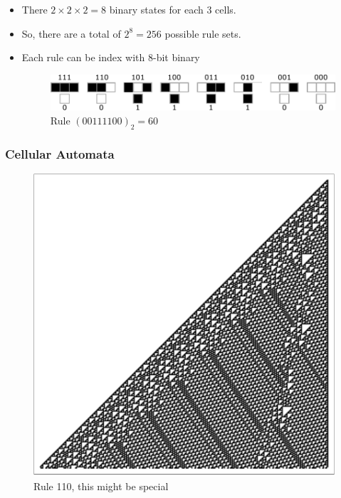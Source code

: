 \documentclass{beamer}
\begin{document}
\begin{frame}
    \begin{itemize}
        \item There $2\times2\times2=8$ binary states for each 3 cells.
        \item So, there are a total of $2^8 = 256$ possible rule sets.
        \item Each rule can be index with 8-bit binary
        \begin{figure}
            \centering
            \includegraphics[scale=0.7]{rule60Num.pdf}
            \caption{Rule $(00111100)_2 = 60$}
        \end{figure}
    \end{itemize}
\end{frame}

\begin{frame}
    \frametitle{Cellular Automata}
    \begin{figure}
        \centering
        \includegraphics[scale=0.53]{fig4.pdf}
        \caption{Rule 110, this might be special}
    \end{figure}
\end{frame}
\end{document}
